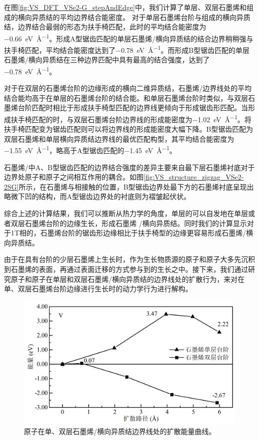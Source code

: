     在图\ref{fig:VS_DFT_VSe2-G_stepAndEdge}中，我们计算了单层、双层石墨烯和组成的横向异质结的平均边界结合能密度。
    对于单层石墨烯台阶与组成的横向异质结，边界结合最弱的形态为扶手椅匹配，此时的平均结合能密度为\SI{-0.66}{\electronvolt\per\angstrom}。形成A型锯齿匹配的单层石墨烯/横向异质结的结合边界稍稍强与扶手椅匹配，平均结合能密度达到了\SI{-0.78}{\electronvolt\per\angstrom}。而形成B型锯齿匹配的单层石墨烯/横向异质结在三种边界匹配中具有最高的结合强度，达到了\SI{-0.78}{\electronvolt\per\angstrom}。

    对于在双层的石墨烯台阶的边缘形成的横向二维异质结，石墨烯/边界线处的平均结合能均高于在单层的石墨烯台阶的结合能。和单层石墨烯台阶时类似，与双层石墨烯台阶匹配时相比于形成扶手椅型匹配的边界线更倾向于形成锯齿形匹配。当形成扶手椅匹配的时，与双层石墨烯台阶边界线的形成能密度为\SI{-1.02}{\electronvolt\per\angstrom}。将扶手椅匹配变为锯齿匹配则可以将边界线的形成能密度大幅下降。B型锯齿匹配为双层石墨烯和单层横向异质结边界线的最优匹配构型，其平均结合能密度为\SI{-1.55}{\electronvolt\per\angstrom}，略高于A型锯齿匹配的\SI{-1.45}{\electronvolt\per\angstrom}。

    石墨烯/中A、B型锯齿匹配的边界结合强度的差异主要来自最下层石墨烯衬底对于边界处原子和原子之间相互作用的耦合。如图\ref{fig:VS_structure_zigzag_VSe2-2SG}所示，在石墨烯与相接触的位置，B型锯齿边界处最下方的石墨烯衬底呈现出略微下凹的结构，而A型锯齿边界处的衬底则为褶皱起伏状。

    综合上述的计算结果，我们可以推断从热力学的角度，单层的可以自发地在单层或者双层石墨烯台阶的边缘生长，形成石墨烯
    /横向异质结。同时我们的计算显示对于1T相的，石墨烯台阶的锯齿形边缘相比于扶手椅型的边缘更容易形成石墨烯/横向异质结。

    由于在具有台阶的少层石墨烯上生长时，作为生长物质源的原子和原子大多先沉积到石墨烯的表面，再通过表面迁移的方式参与到的生长之中。接下来，我们通过研究原子和原子在单层和双层石墨烯/横向异质结的边界线处的扩散行为，来对在单、双层石墨烯台阶边缘进行生长时的动力学行为进行解构。

    \begin{figure}[htb]
        \includegraphics{pic/VS_DFT_NEB_V_GtVSe.png}
        \caption{原子在单、双层石墨烯/横向异质结边界线处的扩散能量曲线。}
        \label{fig:VS_DFT_NEB_V_GtVSe}
    \end{figure}


